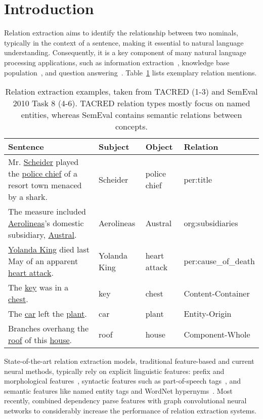 \documentclass[akbc,twoside,11pt]{article}
\begin{document}
\section{Introduction}
\label{Introduction}

Relation extraction aims to identify the relationship between two nominals, typically in the context of a sentence, making it essential to natural language understanding. Consequently, it is a key component of many natural language processing applications, such as information extraction~\cite{fader_openie_2011}, knowledge base population~\cite{tac_kbp_2010}, and question answering~\cite{yu_improvednr_2017}. Table~\ref{tab:re_examples} lists exemplary relation mentions.

\begin{table}[ht!]
    \centering
    \begin{tabular}{p{6cm} l l l}
        \hline
        Sentence & Subject & Object & Relation \\
        \hline
        Mr. \underline{Scheider} played the \underline{police chief} of a resort town menaced by a shark. & Scheider & police chief & per:title \\[20pt]
        The measure included \underline{Aerolineas}'s domestic subsidiary, \underline{Austral}. & Aerolineas & Austral & org:subsidiaries \\[20pt]
        \underline{Yolanda King} died last May of an apparent \underline{heart attack}. & Yolanda King & heart attack & per:cause\_of\_death \\[20pt]
        The \underline{key} was in a \underline{chest}. & key & chest & Content-Container \\[5pt]
        The \underline{car} left the \underline{plant}. & car & plant & Entity-Origin \\[5pt]
        Branches overhang the \underline{roof} of this \underline{house}. & roof & house & Component-Whole\\
        \hline
    \end{tabular}
    \caption{Relation extraction examples, taken from TACRED (1-3) and SemEval 2010 Task 8 (4-6). TACRED relation types mostly focus on named entities, whereas SemEval contains semantic relations between concepts.}
    \label{tab:re_examples}
\end{table}

State-of-the-art relation extraction models, traditional feature-based and current neural methods, typically rely on explicit linguistic features: prefix and morphological features~\cite{mintz_distantsf_2009}, syntactic features such as part-of-speech tags~\cite{zeng_relationcv_2014}, and semantic features like named entity tags and WordNet hypernyms~\cite{xu_improvedrc_2016}. Most recently, \citet{zhang_graphco_2018} combined dependency parse features with graph convolutional neural networks to considerably increase the performance of relation extraction systems.
\end{document}
